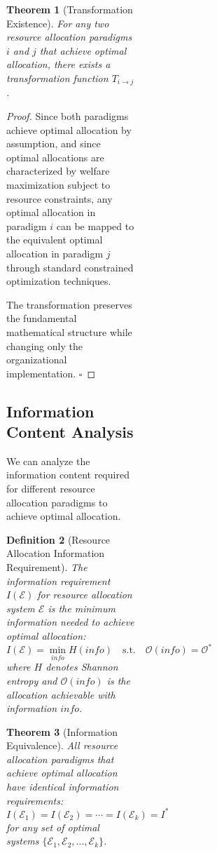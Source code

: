 \documentclass[12pt,a4paper]{article}
\newtheorem{theorem}{Theorem}
\newtheorem{definition}[theorem]{Definition}
\begin{document}
\begin{figure}[H]
\begin{figure}[H]
\begin{figure}[H]
\begin{figure}[H]
\begin{theorem}[Transformation Existence]
For any two resource allocation paradigms $i$ and $j$ that achieve optimal allocation, there exists a transformation function $T_{i \to j}$.
\end{theorem}

\begin{proof}
Since both paradigms achieve optimal allocation by assumption, and since optimal allocations are characterized by welfare maximization subject to resource constraints, any optimal allocation in paradigm $i$ can be mapped to the equivalent optimal allocation in paradigm $j$ through standard constrained optimization techniques.

The transformation preserves the fundamental mathematical structure while changing only the organizational implementation. $\square$
\end{proof}

\subsection{Information Content Analysis}

We can analyze the information content required for different resource allocation paradigms to achieve optimal allocation.

\begin{definition}[Resource Allocation Information Requirement]
The information requirement $I(\mathcal{E})$ for resource allocation system $\mathcal{E}$ is the minimum information needed to achieve optimal allocation:
\begin{equation}
I(\mathcal{E}) = \min_{info} H(info) \quad \text{s.t.} \quad \mathcal{O}(info) = \mathcal{O}^*
\end{equation}
where $H$ denotes Shannon entropy and $\mathcal{O}(info)$ is the allocation achievable with information $info$.
\end{definition}

\begin{theorem}[Information Equivalence]
All resource allocation paradigms that achieve optimal allocation have identical information requirements:
\begin{equation}
I(\mathcal{E}_1) = I(\mathcal{E}_2) = \cdots = I(\mathcal{E}_k) = I^*
\end{equation}
for any set of optimal systems $\{\mathcal{E}_1, \mathcal{E}_2, \ldots, \mathcal{E}_k\}$.
\end{theorem}


\end{figure}
\end{figure}
\end{figure}
\end{figure}
\end{document}
